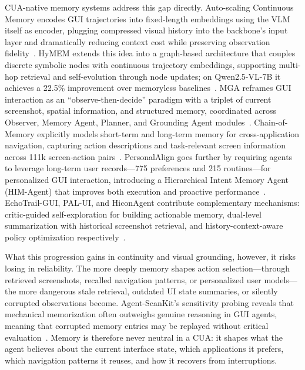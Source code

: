 CUA-native memory systems address this gap directly. Auto-scaling Continuous Memory encodes GUI trajectories into fixed-length embeddings using the VLM itself as encoder, plugging compressed visual history into the backbone's input layer and dramatically reducing context cost while preserving observation fidelity~\cite{autoscalememory2025}. HyMEM extends this idea into a graph-based architecture that couples discrete symbolic nodes with continuous trajectory embeddings, supporting multi-hop retrieval and self-evolution through node updates; on Qwen2.5-VL-7B it achieves a 22.5\% improvement over memoryless baselines~\cite{hymem2026}. MGA reframes GUI interaction as an ``observe-then-decide'' paradigm with a triplet of current screenshot, spatial information, and structured memory, coordinated across Observer, Memory Agent, Planner, and Grounding Agent modules~\cite{mga2025}. Chain-of-Memory explicitly models short-term and long-term memory for cross-application navigation, capturing action descriptions and task-relevant screen information across 111k screen-action pairs~\cite{chainofmemory2025}. PersonalAlign goes further by requiring agents to leverage long-term user records---775 preferences and 215 routines---for personalized GUI interaction, introducing a Hierarchical Intent Memory Agent (HIM-Agent) that improves both execution and proactive performance~\cite{personalalign2026}. EchoTrail-GUI, PAL-UI, and HiconAgent contribute complementary mechanisms: critic-guided self-exploration for building actionable memory, dual-level summarization with historical screenshot retrieval, and history-context-aware policy optimization respectively~\cite{echotrailgui2025,palui2025,hiconagent2025}.

What this progression gains in continuity and visual grounding, however, it risks losing in reliability. The more deeply memory shapes action selection---through retrieved screenshots, recalled navigation patterns, or personalized user models---the more dangerous stale retrieval, outdated UI state summaries, or silently corrupted observations become. Agent-ScanKit's sensitivity probing reveals that mechanical memorization often outweighs genuine reasoning in GUI agents, meaning that corrupted memory entries may be replayed without critical evaluation~\cite{agentscankit2025}. Memory is therefore never neutral in a CUA: it shapes what the agent believes about the current interface state, which applications it prefers, which navigation patterns it reuses, and how it recovers from interruptions.

